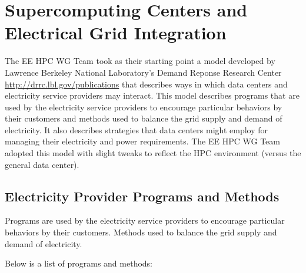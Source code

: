 \documentclass{llncs}
\begin{document}
\section{Supercomputing Centers and Electrical Grid Integration}
%
The EE HPC WG Team took as their starting point a model developed by
Lawrence Berkeley National Laboratory's Demand Reponse Research Center
\href{http://drrc.lbl.gov/publications/demand-response-and-open-automated-demand-response-opportunities-data-centers}
{http://drrc.lbl.gov/publications}
 that describes ways in which data centers and electricity service
providers may interact. This model describes programs that are used by the
electricity service providers to encourage particular behaviors by their
customers and methods used to balance the grid supply and demand of
electricity. It also describes strategies that data centers might employ for
managing their electricity and power requirements. The EE HPC WG Team
adopted this model with slight tweaks to reflect the HPC environment (versus
the general data center).

\subsection{Electricity Provider Programs and Methods}
Programs are used by the electricity service providers to encourage
particular behaviors by their customers. Methods used to balance the grid
supply and demand of electricity.

Below is a list of programs and methods:
\end{document}
